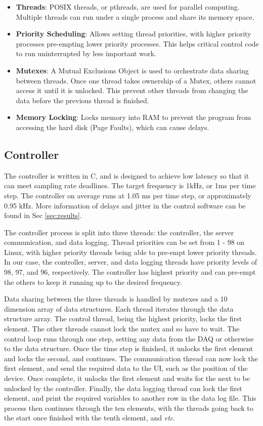 \documentclass[12pt]{report}
\begin{document}
\begin{itemize}
	\item \textbf{Threads}: POSIX threads, or pthreads, are used for parallel computing. Multiple threads can run under a single process and share its memory space.
	\item \textbf{Priority Scheduling}: Allows setting thread priorities, with higher priority processes pre-empting lower priority processes. This helps critical control code to run uninterrupted by less important work. 
	\item \textbf{Mutexes}: A Mutual Exclusions Object is used to orchestrate data sharing between threads. Once one thread takes ownership of a Mutex, others cannot access it until it is unlocked. This prevent other threads from changing the data before the previous thread is finished. 
	\item \textbf{Memory Locking}: Locks memory into RAM to prevent the program from accessing the hard disk (Page Faults), which can cause delays. 
\end{itemize}
	
	\subsection{Controller}
	
	The controller is written in C, and is designed to achieve low latency so that it can meet sampling rate deadlines. The target frequency is 1kHz, or 1ms per time step. The controller on average runs at 1.05 ms per time step, or approximately 0.95 kHz. More information of delays and jitter in the control software can be found in Sec \ref{sec:results}. 
	

	
	
	The controller process is split into three threads: the controller, the server communication, and data logging. Thread priorities can be set from 1 - 98 on Linux, with higher priority threads being able to pre-empt lower priority threads. In our case, the controller, server, and data logging threads have priority levels of 98, 97, and 96, respectively. The controller has highest priority and can pre-empt the others to keep it running up to the desired frequency. 
	
	Data sharing between the three threads is handled by mutexes and a 10 dimension array of data structures. Each thread iterates through the data structure array. The control thread, being the highest priority, locks the first element. The other threads cannot lock the mutex and so have to wait. The control loop runs through one step, setting any data from the DAQ or otherwise to the data structure. Once the time step is finished, it unlocks the first element and locks the second, and continues. The communication thread can now lock the first element, and send the required data to the UI, such as the position of the device. Once complete, it unlocks the first element and waits for the next to be unlocked by the controller. Finally, the data logging thread  can lock the first element, and print the required variables to another row in the data log file. This process then continues through the ten elements, with the threads going back to the start once finished with the tenth element, and \textit{etc}. 
	
\end{document}
